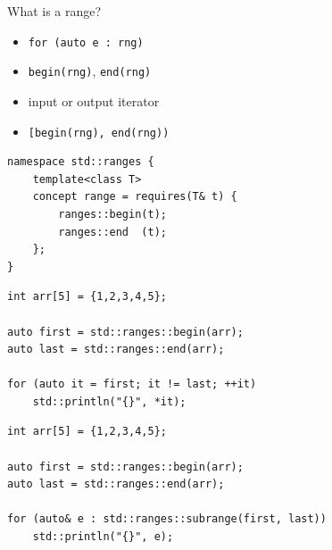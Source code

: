\documentclass[aspectratio=169]{beamer}
\begin{document}

\begin{frame}[c]
    \Huge
    \begin{center}
        What is a range?
    \end{center}
\end{frame}

\begin{frame}[fragile,c]
    \Large
    \begin{itemize}
        \item \texttt{for (auto e : rng) {}}
        \pause \item \texttt{begin(rng)}, \texttt{end(rng)}
        \pause \item input or output iterator
        \pause \item \texttt{[begin(rng), end(rng))}
    \end{itemize}
\end{frame}

\begin{frame}[fragile,c]
\Large
\begin{center}
\begin{verbatim}
namespace std::ranges {
    template<class T>
    concept range = requires(T& t) {
        ranges::begin(t);
        ranges::end  (t);
    };
}
\end{verbatim}
\end{center}
\end{frame}

\begin{frame}[fragile,c]
\Large
\begin{center}
\begin{verbatim}
int arr[5] = {1,2,3,4,5};

auto first = std::ranges::begin(arr);
auto last = std::ranges::end(arr);

for (auto it = first; it != last; ++it)
    std::println("{}", *it);
\end{verbatim}
\end{center}
\let\thefootnote\relax{}
\end{frame}

\begin{frame}[fragile,c]
\Large
\begin{center}
\begin{verbatim}
int arr[5] = {1,2,3,4,5};

auto first = std::ranges::begin(arr);
auto last = std::ranges::end(arr);

for (auto& e : std::ranges::subrange(first, last))
    std::println("{}", e);
\end{verbatim}
\end{center}
\let\thefootnote\relax{}
\end{frame}
\end{document}
